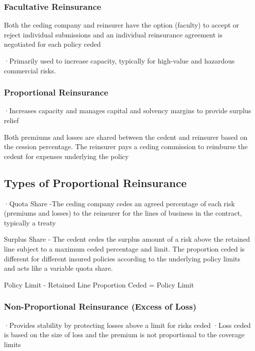 \documentclass[
]{article}
\begin{document}
\subsubsection{Facultative Reinsurance}\label{facultative-reinsurance}

Both the ceding company and reinsurer have the option (faculty) to
accept or reject individual submissions and an individual reinsurance
agreement is negotiated for each policy ceded

·Primarily used to increase capacity, typically for high-value and
hazardous commercial risks.

\subsubsection{Proportional Reinsurance}\label{proportional-reinsurance}

·Increases capacity and manages capital and solvency margins to provide
surplus relief

Both premiums and losses are shared between the cedent and reinsurer
based on the cession percentage. The reinsurer pays a ceding commission
to reimburse the cedent for expenses underlying the policy

\subsection{Types of Proportional
Reinsurance}\label{types-of-proportional-reinsurance}

·Quota Share -The ceding company cedes an agreed percentage of each risk
(premiums and losses) to the reinsurer for the lines of business in the
contract, typically a treaty

Surplus Share - The cedent cedes the surplus amount of a risk above the
retained line subject to a maximum ceded percentage and limit. The
proportion ceded is different for different insured policies according
to the underlying policy limits and acts like a variable quota share.

Policy Limit - Retained Line Proportion Ceded = Policy Limit

\subsubsection{Non-Proportional Reinsurance (Excess of
Loss)}\label{non-proportional-reinsurance-excess-of-loss}

·Provides stability by protecting losses above a limit for risks ceded
·Loss ceded is based on the size of loss and the premium is not
proportional to the coverage limits
\end{document}
